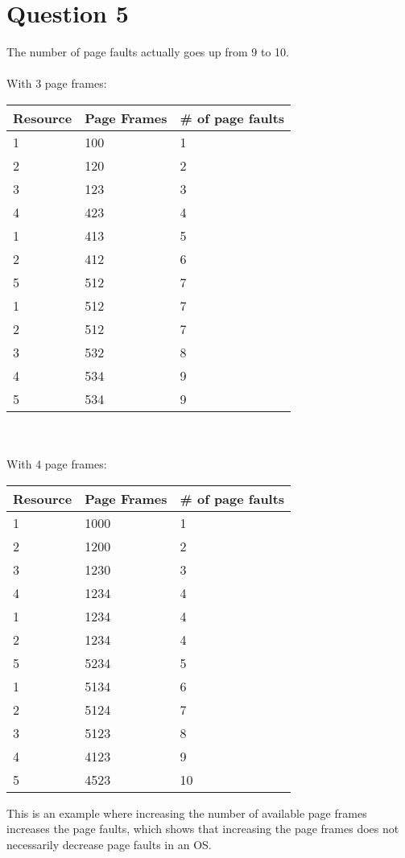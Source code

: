 \documentclass[12pt]{article}
\begin{document}
	\section*{Question 5}
	The number of page faults actually goes up from 9 to 10.
	\\\\
	With 3 page frames: \\
	\begin{tabular}[c]{| l | l | l |}
		\hline
		Resource & Page Frames & \# of page faults \\
		\hline
		1 & 100 & 1 \\
		2 & 120 & 2 \\
		3 & 123 & 3 \\
		4 & 423 & 4 \\
		1 & 413 & 5 \\
		2 & 412 & 6 \\
		5 & 512 & 7 \\
		1 & 512 & 7 \\
		2 & 512 & 7 \\
		3 & 532 & 8 \\
		4 & 534 & 9 \\
		5 & 534 & 9 \\
		\hline
	\end{tabular}
	\\\\
	With 4 page frames: \\
	\begin{tabular}[c]{| l | l | l |}
		\hline
		Resource & Page Frames & \# of page faults \\
		\hline
		1 & 1000 & 1 \\
		2 & 1200 & 2 \\
		3 & 1230 & 3 \\
		4 & 1234 & 4 \\
		1 & 1234 & 4 \\
		2 & 1234 & 4 \\
		5 & 5234 & 5 \\
		1 & 5134 & 6 \\
		2 & 5124 & 7 \\
		3 & 5123 & 8 \\
		4 & 4123 & 9 \\
		5 & 4523 & 10 \\
		\hline
	\end{tabular}

	This is an example where increasing the number of available page frames increases the page faults, which shows that increasing the page frames does not necessarily decrease page faults in an OS.
\end{document}
